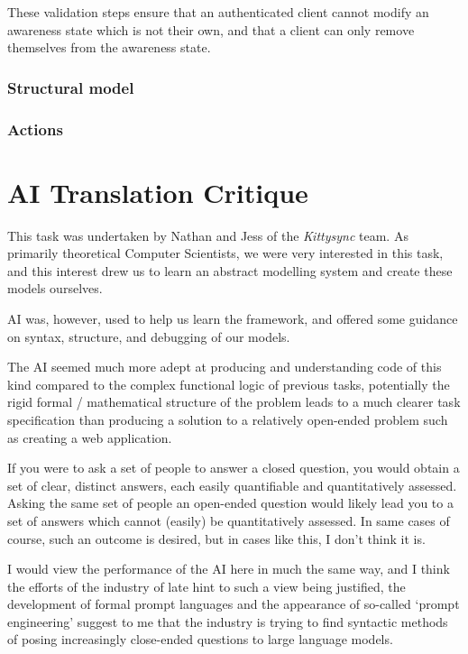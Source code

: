 \documentclass[a4paper, final]{report}
\begin{document}
These validation steps ensure that an authenticated client cannot modify an awareness state which is not
their own, and that a client can only remove themselves from the awareness state.

\subsection{Structural model}

\subsection{Actions}

\chapter{AI Translation Critique}

This task was undertaken by Nathan and Jess of the \textit{Kittysync} team. As primarily theoretical
Computer Scientists, we were very interested in this task, and this interest drew us to learn
an abstract modelling system and create these models ourselves.

AI was, however, used to help us learn the framework, and offered some guidance on syntax, structure,
and debugging of our models.

The AI seemed much more adept at producing and understanding code of this kind compared to the complex
functional logic of previous tasks, potentially the rigid formal / mathematical structure of the
problem leads to a much clearer task specification than producing a solution to a relatively open-ended
problem such as creating a web application.

If you were to ask a set of people to answer a closed question, you would obtain a set of clear,
distinct answers, each easily quantifiable and quantitatively assessed. Asking the same set of people
an open-ended question would likely lead you to a set of answers which cannot (easily) be quantitatively
assessed. In same cases of course, such an outcome is desired, but in cases like this, I don't think
it is.

I would view the performance of the AI here in much the same way, and I think the efforts of the
industry of late hint to such a view being justified, the development of formal prompt languages and
the appearance of so-called `prompt engineering' suggest to me that the industry is trying to find
syntactic methods of posing increasingly close-ended questions to large language models.
\end{document}
